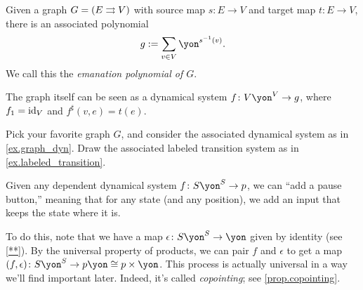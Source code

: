\documentclass[Book-Poly]{subfiles}
\begin{document}
\begin{example}[Graphs] \label{ex.graph_dyn}
Given a graph $G = (E \rightrightarrows V)$ with source map $s \colon E \to V$ and target map $t \colon E \to V$, there is an associated polynomial
\[
    g := \sum_{v \in V} \yon^{s\inv(v)}.
\]
We call this the \emph{emanation polynomial of $G$}.

The graph itself can be seen as a dynamical system $f \colon V\yon^V \to g$, where $f_1 = \mathrm{id}_V$ and $f^\sharp(v, e) = t(e)$.
\end{example}

\begin{exercise}
Pick your favorite graph $G$, and consider the associated dynamical system as in \cref{ex.graph_dyn}.
Draw the associated labeled transition system as in \cref{ex.labeled_transition}.
\end{exercise}

\begin{example}\label{ex.pause}
Given any dependent dynamical system $f\colon S\yon^S\to p$, we can ``add a pause button,'' meaning that for any state (and any position), we add an input that keeps the state where it is.

To do this, note that we have a map $\epsilon\colon S\yon^S\to\yon$ given by identity (see \cref{**}). By the universal property of products, we can pair $f$ and $\epsilon$ to get a map $(f,\epsilon)\colon S\yon^S\to p\yon\cong p\times \yon$. This process is actually universal in a way we'll find important later. Indeed, it's called \emph{copointing}; see \cref{prop.copointing}.
\end{example}
\end{document}
